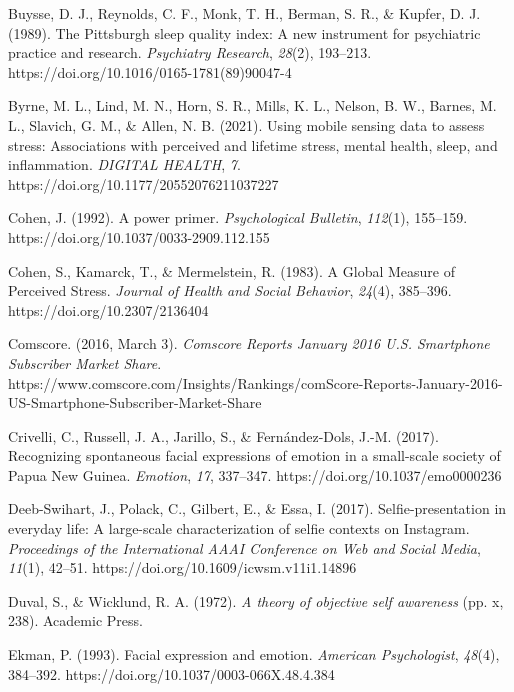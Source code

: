 \documentclass[authordate, empirical,issue]{jote-new-article}
\begin{document}
Buysse, D. J., Reynolds, C. F., Monk, T. H., Berman, S. R., \& Kupfer, D. J. (1989). The Pittsburgh sleep quality index: A new instrument for psychiatric practice and research. \emph{Psychiatry Research}, \emph{28}(2), 193--213. https://doi.org/10.1016/0165-1781(89)90047-4



Byrne, M. L., Lind, M. N., Horn, S. R., Mills, K. L., Nelson, B. W., Barnes, M. L., Slavich, G. M., \& Allen, N. B. (2021). Using mobile sensing data to assess stress: Associations with perceived and lifetime stress, mental health, sleep, and inflammation. \emph{DIGITAL HEALTH}, \emph{7}. https://doi.org/10.1177/20552076211037227



Cohen, J. (1992). A power primer. \emph{Psychological Bulletin}, \emph{112}(1), 155--159. https://doi.org/10.1037/0033-2909.112.155



Cohen, S., Kamarck, T., \& Mermelstein, R. (1983). A Global Measure of Perceived Stress. \emph{Journal of Health and Social Behavior}, \emph{24}(4), 385--396. https://doi.org/10.2307/2136404



Comscore. (2016, March 3). \emph{Comscore}\emph{ Reports January 2016 U.S. Smartphone Subscriber Market Share}. https://www.comscore.com/Insights/Rankings/comScore-Reports-January-2016-US-Smartphone-Subscriber-Market-Share



Crivelli, C., Russell, J. A., Jarillo, S., \& Fernández-Dols, J.-M. (2017). Recognizing spontaneous facial expressions of emotion in a small-scale society of Papua New Guinea. \emph{Emotion}, \emph{17}, 337--347. https://doi.org/10.1037/emo0000236



Deeb-Swihart, J., Polack, C., Gilbert, E., \& Essa, I. (2017). Selfie-presentation in everyday life: A large-scale characterization of selfie contexts on Instagram. \emph{Proceedings of the International AAAI Conference on Web and }\emph{Social Media}, \emph{11}(1), 42--51. https://doi.org/10.1609/icwsm.v11i1.14896



Duval, S., \& Wicklund, R. A. (1972). \emph{A theory of objective }\emph{self awareness} (pp. x, 238). Academic Press.



Ekman, P. (1993). Facial expression and emotion. \emph{American Psychologist}, \emph{48}(4), 384--392. https://doi.org/10.1037/0003-066X.48.4.384
\end{document}
